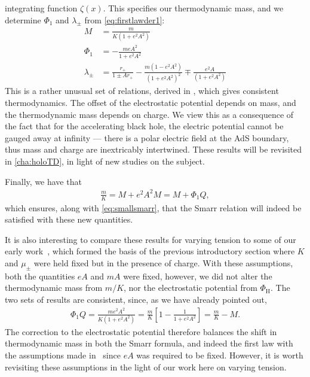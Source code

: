 \documentclass[
twoside,
openright,
frontopenright,
]{dmathesis}
\newcommand{\nn}{\nonumber}
\begin{document}
integrating function $\zeta(x)$. This specifies our thermodynamic mass, and we
determine $\Phi_1$ and $\lambda_\pm$ from \cref{eq:firstlawder1}:
\begin{align}
M &= \frac{m}{K(1+e^2 A^2)} \nn\\
\Phi_1 &= -\frac{meA^2}{1+e^2 A^2}\nn\\
\lambda_\pm &= \frac{r_+}{1\pm Ar_+} - \frac{m(1-e^2A^2)}{(1+e^2 A^2)^2} 
\mp \frac{e^2A}{(1+e^2 A^2)}
\label{TDparams}
\end{align}
This is a rather unusual set of relations, derived in \cite{Appels:2017xoe},
which gives consistent thermodynamics. The offset of the electrostatic
potential depends on mass, and the thermodynamic mass depends on charge. We view
this as a consequence of the fact that for the accelerating black hole, the
electric potential cannot be gauged away at infinity --- there is a polar
electric field at the AdS boundary, thus mass and charge are inextricably
intertwined. These results will be revisited in \cref{cha:holoTD}, in light of
new studies on the subject.

Finally, we have that
\begin{align}
  \frac{m}{K} = M+e^2A^2M = M+\Phi_1Q,
\end{align}
which ensures, along with \cref{eq:smallsmarr}, that the Smarr relation will
indeed be satisfied with these new quantities.

It is also interesting to compare these results for varying tension to some of
our early work~\cite{Appels:2016uha}, which formed the basis of the previous
introductory section where $K$ and $\mu_\pm$ were held fixed but in the presence
of charge. With these assumptions, both the quantities $eA$ and $mA$ were fixed,
however, we did not alter the thermodynamic mass from $m/K$, nor the
electrostatic potential from $\Phi_\mathrm{H}$. The two sets of results are
consistent, since, as we have already pointed out,
\begin{align*}
\Phi_1 Q = \frac{m e^2 A^2}{K(1+e^2 A^2)} 
= \frac{m}{K} \left [ 1 - \frac{1}{1+e^2 A^2} \right] = \frac{m}{K} - M.
\end{align*}
The correction to the electrostatic potential therefore balances the shift in
thermodynamic mass in both the Smarr formula, and indeed the first law with the
assumptions made in~\cite{Appels:2016uha} since $eA$ was required to be
fixed. However, it is worth revisiting these assumptions in the light of our
work here on varying tension.
\end{document}
